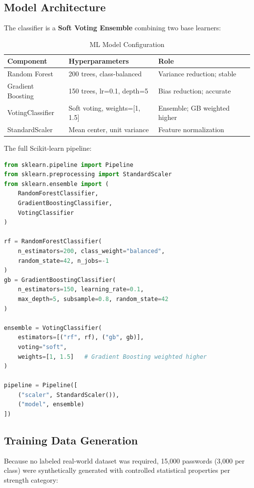 \documentclass[12pt,a4paper]{article}
\begin{document}
\subsection{Model Architecture}

The classifier is a \textbf{Soft Voting Ensemble} combining two base learners:

\begin{table}[H]
\centering
\begin{tabular}{lll}
\toprule
\textbf{Component} & \textbf{Hyperparameters} & \textbf{Role} \\
\midrule
Random Forest     & 200 trees, class-balanced  & Variance reduction; stable \\
Gradient Boosting & 150 trees, lr=0.1, depth=5 & Bias reduction; accurate \\
VotingClassifier  & Soft voting, weights=[1, 1.5] & Ensemble; GB weighted higher \\
StandardScaler    & Mean center, unit variance  & Feature normalization \\
\bottomrule
\end{tabular}
\caption{ML Model Configuration}
\end{table}

The full Scikit-learn pipeline:

\begin{lstlisting}[language=Python, caption={Model Training Pipeline}]
from sklearn.pipeline import Pipeline
from sklearn.preprocessing import StandardScaler
from sklearn.ensemble import (
    RandomForestClassifier,
    GradientBoostingClassifier,
    VotingClassifier
)

rf = RandomForestClassifier(
    n_estimators=200, class_weight="balanced",
    random_state=42, n_jobs=-1
)
gb = GradientBoostingClassifier(
    n_estimators=150, learning_rate=0.1,
    max_depth=5, subsample=0.8, random_state=42
)

ensemble = VotingClassifier(
    estimators=[("rf", rf), ("gb", gb)],
    voting="soft",
    weights=[1, 1.5]   # Gradient Boosting weighted higher
)

pipeline = Pipeline([
    ("scaler", StandardScaler()),
    ("model", ensemble)
])
\end{lstlisting}

\subsection{Training Data Generation}

Because no labeled real-world dataset was required, 15,000 passwords
(3,000 per class) were synthetically generated with controlled statistical
properties per strength category:
\end{document}
